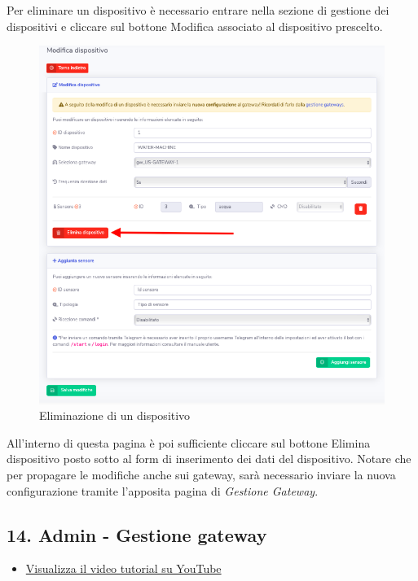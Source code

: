 		Per eliminare un dispositivo è necessario entrare nella sezione di gestione dei dispositivi e cliccare sul bottone Modifica associato al dispositivo prescelto. 

		\begin{figure}[H]
		\centering
		\includegraphics[scale=0.600]{res/images/admin/elimDisp.png}
		\caption{Eliminazione di un dispositivo}
	\end{figure}

		All'interno di questa pagina è poi sufficiente cliccare sul bottone Elimina dispositivo posto sotto al form di inserimento dei dati del dispositivo.
		Notare che per propagare le modifiche anche sui gateway, sarà necessario inviare la nuova configurazione tramite l'apposita pagina di \textit{Gestione Gateway}.

\newpage \subsection{14. Admin - Gestione gateway}
	
	\begin{itemize}
		\item \href{https://www.youtube.com/watch?v=PjySMOLCtMA&list=PLPKYjnuIh1FA3b3jn_bwY_ztYzaFn2mIT&index=17}{Visualizza il video tutorial su YouTube} 
	\end{itemize}


